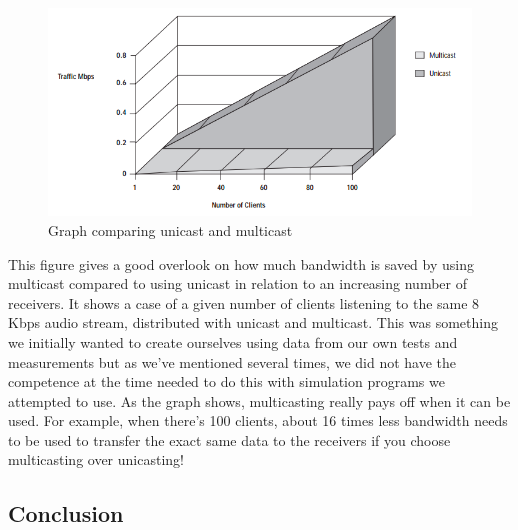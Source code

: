 \documentclass[9pt,a4paper]{acmproc}
\begin{document}
\begin{figure}[h!]
\includegraphics[width=\linewidth]{graph.png}
\caption{Graph comparing unicast and multicast}
\label{fig:graph}
\end{figure}

This figure gives a good overlook on how much bandwidth is saved by using multicast compared to using unicast in relation to an increasing number of receivers. It shows a case of a given number of clients listening to the same 8 Kbps audio stream, distributed with unicast and multicast. This was something we initially wanted to create ourselves using data from our own tests and measurements but as we've mentioned several times, we did not have the competence at the time needed to do this with simulation programs we attempted to use. As the graph shows, multicasting really pays off when it can be used. For example, when there's 100 clients, about 16 times less bandwidth needs to be used to transfer the exact same data to the receivers if you choose multicasting over unicasting! \cite[s.~4]{graphSource}

\subsection{Conclusion}
\end{document}
